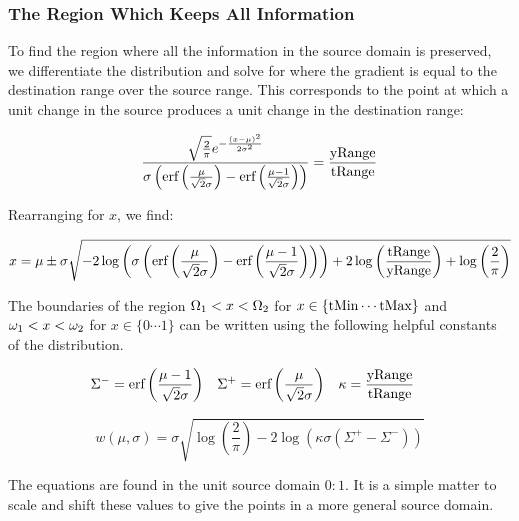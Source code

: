 \subsubsection{The Region Which Keeps All Information}
To find the region where all the information in the source domain is preserved, we differentiate the distribution and solve for where the gradient is equal to the destination range over the source range. This corresponds to the point at which a unit change in the source produces a unit change in the destination range:

\begin{equation}\label{eq:Boundaries}
\frac{\sqrt{\frac{2}{\pi }} e^{-\frac{(x-\mu )^2}{2 \sigma ^2}}}{\sigma  \left(\text{erf}\left(\frac{\mu }{\sqrt{2} \sigma }\right)-\text{erf}\left(\frac{\mu -1}{\sqrt{2} \sigma }\right)\right)}=\frac{\text{yRange}}{\text{tRange}}
\end{equation}

Rearranging for $x$, we find:

\begin{equation}\label{eq:PreservedRegion}
 x=\mu \pm \sigma  \sqrt{-2 \log \left(\sigma  \left(\text{erf}\left(\frac{\mu }{\sqrt{2} \sigma }\right)-\text{erf}\left(\frac{\mu -1}{\sqrt{2} \sigma }\right)\right)\right)+2 \log \left(\frac{\text{tRange}}{\text{yRange}}\right)+\log \left(\frac{2}{\pi }\right)}
\end{equation}


The boundaries of the region $\Omega_1 < x < \Omega_2$ for $x \in \{\text{tMin} \cdots \text{tMax} \}$ and $\omega_1 < x < \omega_2$ for $x \in \{0 \cdots 1 \}$ can be written using the following helpful constants of the distribution.

\begin{align}\label{eq:DistributionConstants}
\Sigma^- &= \text{erf}\left(\frac{\mu -1}{\sqrt{2} \sigma }\right) &
 \Sigma^+ &= \text{erf}\left(\frac{\mu }{\sqrt{2} \sigma }\right) &
  \kappa &= \frac{\text{yRange}}{\text{tRange}} 
\end{align}

\begin{equation}\label{eq:PreservedRegionConsts}
  w(\mu,\sigma)  =  \sigma  \sqrt{ \log \left(\frac{2}{\pi } \right) -2 \log \left(\kappa \sigma  \left(\Sigma^+-\Sigma^-\right)\right) }
\end{equation}

The equations are found in the unit source domain $0:1$. It is a simple matter to scale and shift these values to give the points in a more general source domain.

